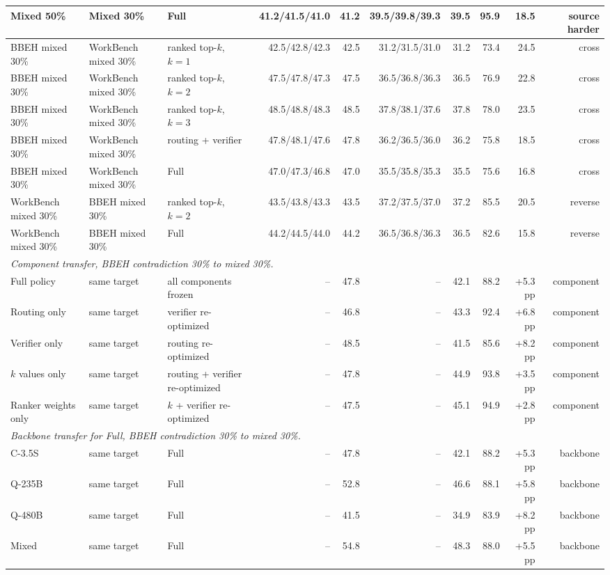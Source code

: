 \begin{longtable}{lllrrrrrrr}
Mixed 50\% & Mixed 30\% & \method{} Full & 41.2/41.5/41.0 & 41.2 & 39.5/39.8/39.3 & 39.5 & 95.9 & 18.5 & source harder \\
\midrule
BBEH mixed 30\% & WorkBench mixed 30\% & ranked top-$k$, $k=1$ & 42.5/42.8/42.3 & 42.5 & 31.2/31.5/31.0 & 31.2 & 73.4 & 24.5 & cross \\
BBEH mixed 30\% & WorkBench mixed 30\% & ranked top-$k$, $k=2$ & 47.5/47.8/47.3 & 47.5 & 36.5/36.8/36.3 & 36.5 & 76.9 & 22.8 & cross \\
BBEH mixed 30\% & WorkBench mixed 30\% & ranked top-$k$, $k=3$ & 48.5/48.8/48.3 & 48.5 & 37.8/38.1/37.6 & 37.8 & 78.0 & 23.5 & cross \\
BBEH mixed 30\% & WorkBench mixed 30\% & \method{} routing + verifier & 47.8/48.1/47.6 & 47.8 & 36.2/36.5/36.0 & 36.2 & 75.8 & 18.5 & cross \\
\rowcolor{tracesoft}
BBEH mixed 30\% & WorkBench mixed 30\% & \method{} Full & 47.0/47.3/46.8 & 47.0 & 35.5/35.8/35.3 & 35.5 & 75.6 & 16.8 & cross \\
WorkBench mixed 30\% & BBEH mixed 30\% & ranked top-$k$, $k=2$ & 43.5/43.8/43.3 & 43.5 & 37.2/37.5/37.0 & 37.2 & 85.5 & 20.5 & reverse \\
WorkBench mixed 30\% & BBEH mixed 30\% & \method{} Full & 44.2/44.5/44.0 & 44.2 & 36.5/36.8/36.3 & 36.5 & 82.6 & 15.8 & reverse \\
\midrule
\multicolumn{10}{l}{\emph{Component transfer, BBEH contradiction 30\% to mixed 30\%.}} \\
Full policy & same target & all components frozen & -- & 47.8 & -- & 42.1 & 88.2 & +5.3 pp & component \\
Routing only & same target & verifier re-optimized & -- & 46.8 & -- & 43.3 & 92.4 & +6.8 pp & component \\
Verifier only & same target & routing re-optimized & -- & 48.5 & -- & 41.5 & 85.6 & +8.2 pp & component \\
$k$ values only & same target & routing + verifier re-optimized & -- & 47.8 & -- & 44.9 & 93.8 & +3.5 pp & component \\
Ranker weights only & same target & $k$ + verifier re-optimized & -- & 47.5 & -- & 45.1 & 94.9 & +2.8 pp & component \\
\midrule
\multicolumn{10}{l}{\emph{Backbone transfer for \method{} Full, BBEH contradiction 30\% to mixed 30\%.}} \\
C-3.5S & same target & \method{} Full & -- & 47.8 & -- & 42.1 & 88.2 & +5.3 pp & backbone \\
Q-235B & same target & \method{} Full & -- & 52.8 & -- & 46.6 & 88.1 & +5.8 pp & backbone \\
Q-480B & same target & \method{} Full & -- & 41.5 & -- & 34.9 & 83.9 & +8.2 pp & backbone \\
Mixed & same target & \method{} Full & -- & 54.8 & -- & 48.3 & 88.0 & +5.5 pp & backbone \\
\end{longtable}
\endgroup
